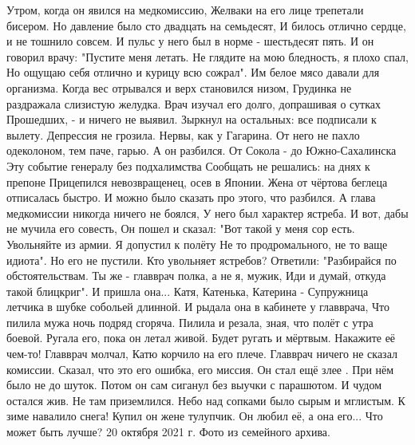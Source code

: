 Утром, когда он явился на медкомиссию,
Желваки на его лице трепетали бисером.
Но давление было сто двадцать на семьдесят,
И билось отлично сердце, и не тошнило совсем.
И пульс у него был в норме - шестьдесят пять.
И он говорил врачу: "Пустите меня летать.
Не глядите на мою бледность, я плохо спал,
Но ощущаю себя отлично и курицу всю сожрал".
Им белое мясо давали для организма.
Когда вес отрывался и верх становился низом,
Грудинка не раздражала слизистую желудка.
Врач изучал его долго, допрашивая о сутках
Прошедших, - и ничего не выявил.
Зыркнул на остальных: все подписали к вылету.
Депрессия не грозила. Нервы, как у Гагарина.
От него не пахло одеколоном, тем паче, гарью.
А он разбился. От Сокола - до Южно-Сахалинска
Эту событие генералу без подхалимства
Сообщать не решались: на днях к препоне
Прицепился невозвращенец, осев в Японии.
Жена от чёртова беглеца отписалась быстро.
И можно было сказать про этого, что разбился.
А глава медкомиссии никогда ничего не боялся,
У него был характер ястреба.
И вот, дабы не мучила его совесть, 
Он пошел и сказал: "Вот такой у меня сор есть.
Увольняйте из армии. Я допустил к полёту
Не то продромального, не то ваще идиота".
Но его не пустили. Кто увольняет ястребов?
Ответили: "Разбирайся по обстоятельствам.
Ты же - главврач полка, а не я, мужик,
Иди и думай, откуда такой блицкриг".
И пришла она... Катя, Катенька, Катерина -
Супружница летчика в шубке собольей длинной.
И рыдала она в кабинете у главврача,
Что пилила мужа ночь подряд сгоряча.
Пилила и резала, зная, что полёт с утра боевой.
Ругала его, пока он летал живой.
Будет ругать и мёртвым. Накажите её чем-то!
Главврач молчал, Катю корчило на его плече.
Главврач ничего не сказал комиссии.
Сказал, что это его ошибка, его миссия.
Он стал ещё злее . При нём было не до шуток.
Потом он сам сиганул без выучки с парашютом.
И чудом остался жив. Не там приземлился.
Небо над сопками было сырым и мглистым.
К зиме навалило снега! Купил он жене тулупчик.
Он любил её, а она его... Что может быть лучше?
20 октября 2021 г.
Фото из семейного архива.

